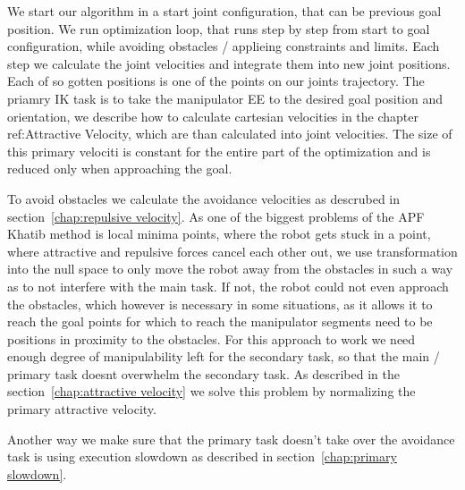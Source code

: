 \documentclass[]{article}
\begin{document}
We start our algorithm in a start joint configuration, that can be previous goal position. We run optimization loop, that runs step by step from start to goal configuration, while avoiding obstacles / applieing constraints and limits. Each step we calculate the joint velocities and integrate them into new joint positions. Each of so gotten positions is one of the points on our joints trajectory. The priamry IK task is to take the manipulator EE to the desired goal position and orientation, we describe how to calculate cartesian velocities in the chapter ref:Attractive Velocity, which are than calculated into joint velocities. The size of this primary velociti is constant for the entire part of the optimization and is reduced only when approaching the goal. 

To avoid obstacles we calculate the avoidance velocities as descrubed in section~\ref{chap:repulsive velocity}. As one of the biggest problems of the APF Khatib method is local minima points, where the robot gets stuck in a point, where attractive and repulsive forces cancel each other out, we use transformation into the null space  to only move the robot away from the obstacles in such a way as to not interfere with the main task. If not, the robot could not even approach the obstacles, which however is necessary in some situations, as it allows it to reach the goal points for which to reach the manipulator segments need to be positions in proximity to the obstacles. For this approach to work we need enough degree of manipulability left for the secondary task, so that the main / primary task doesnt overwhelm the secondary task. As described in the section~\ref{chap:attractive velocity} we solve this problem by normalizing the primary attractive velocity. 


Another way we make sure that the primary task doesn't take over the avoidance task is using execution slowdown as described in section~\ref{chap:primary slowdown}.





\end{document}
